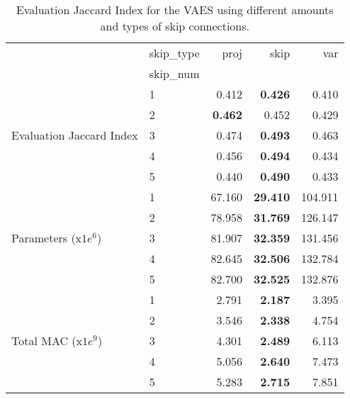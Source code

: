 \begin{table}[ht]
\centering
\caption{Evaluation Jaccard Index for the VAES using different amounts and types of skip connections.}
\label{tab:skip_results}
\begin{tabular}{llrrr}
\toprule
 & skip\_type & proj & skip & var \\
 & skip\_num &  &  &  \\
\midrule
\multirow[t]{5}{*}{Evaluation Jaccard Index} & 1 & 0.412 & \textbf{0.426} & 0.410 \\
 & 2 & \textbf{0.462} & 0.452 & 0.429 \\
 & 3 & 0.474 & \textbf{0.493} & 0.463 \\
 & 4 & 0.456 & \textbf{0.494} & 0.434 \\
 & 5 & 0.440 & \textbf{0.490} & 0.433 \\
\cline{1-5}
\multirow[t]{5}{*}{Parameters (x$1e^6$)} & 1 & 67.160 & \textbf{29.410} & 104.911 \\
 & 2 & 78.958 & \textbf{31.769} & 126.147 \\
 & 3 & 81.907 & \textbf{32.359} & 131.456 \\
 & 4 & 82.645 & \textbf{32.506} & 132.784 \\
 & 5 & 82.700 & \textbf{32.525} & 132.876 \\
\cline{1-5}
\multirow[t]{5}{*}{Total MAC (x$1e^9$)} & 1 & 2.791 & \textbf{2.187} & 3.395 \\
 & 2 & 3.546 & \textbf{2.338} & 4.754 \\
 & 3 & 4.301 & \textbf{2.489} & 6.113 \\
 & 4 & 5.056 & \textbf{2.640} & 7.473 \\
 & 5 & 5.283 & \textbf{2.715} & 7.851 \\
\cline{1-5}
\bottomrule
\end{tabular}
\end{table}
